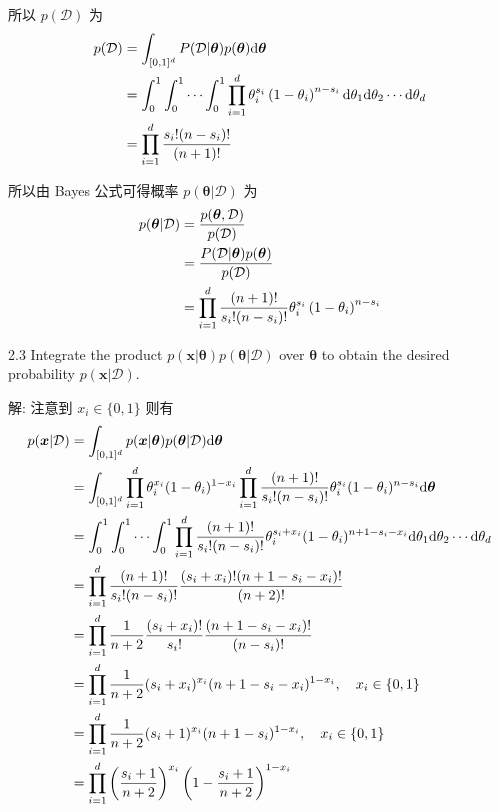 \documentclass{article}
\begin{document}
所以 $p(\mathcal{D})$ 为
\begin{equation}
  \begin{aligned}
    p(\mathcal{D})
    &=\int_{[0,1]^d} P(\mathcal{D}|\bm{\theta})p(\bm{\theta})\mathrm{d}\bm{\theta}\\
    &=\int_0^1\int_0^1\cdots\int_0^1 \prod_{i=1}^d\theta_{i}^{s_{i}}\left(1-\theta_{i}\right)^{n-s_{i}}\mathrm{d}\theta_1\mathrm{d}\theta_2\cdots\mathrm{d}\theta_d\\
    &=\prod_{i=1}^d\frac{s_i!(n-s_i)!}{(n+1)!}\\
  \end{aligned}
\end{equation}

所以由 Bayes 公式可得概率 $p(\bm{\theta}|\mathcal{D})$ 为
\begin{equation}
  \begin{aligned}
    p(\bm{\theta}|\mathcal{D})
    &=\frac{p(\bm{\theta},\mathcal{D})}{p(\mathcal{D})}\\
    &=\frac{P(\mathcal{D}|\bm{\theta})p(\bm{\theta})}{p(\mathcal{D})}\\
    &=\prod_{i=1}^d\frac{(n+1)!}{s_i!(n-s_i)!}\theta_{i}^{s_{i}}\left(1-\theta_{i}\right)^{n-s_{i}}\\
  \end{aligned}
\end{equation}

2.3 Integrate the product $p(\bm{x}|\bm{\theta}) p(\bm{\theta}|\mathcal{D})$ over $\bm{\theta}$ to obtain the desired probability $p(\bm{x}|\mathcal{D})$.

解: 注意到 $x_i\in\{0,1\}$ 则有
\begin{equation}
  \begin{aligned}
    p(\bm{x}|\mathcal{D})
    &=\int_{[0,1]^d} p(\bm{x}|\bm{\theta}) p(\bm{\theta}|\mathcal{D})\mathrm{d}\bm{\theta}\\
    &=\int_{[0,1]^d} \prod_{i=1}^{d} \theta_{i}^{x_{i}}(1-\theta_{i})^{1-x_{i}} \prod_{i=1}^d\frac{(n+1)!}{s_i!(n-s_i)!}\theta_{i}^{s_{i}}(1-\theta_{i})^{n-s_{i}}\mathrm{d}\bm{\theta}\\
    &=\int_0^1\int_0^1\cdots\int_0^1 \prod_{i=1}^{d}\frac{(n+1)!}{s_i!(n-s_i)!}\theta_{i}^{s_{i}+x_{i}}(1-\theta_{i})^{n+1-s_{i}-x_i}\mathrm{d}\theta_1\mathrm{d}\theta_2\cdots\mathrm{d}\theta_d\\
    &=\prod_{i=1}^{d}\frac{(n+1)!}{s_i!(n-s_i)!}\frac{(s_i+x_i)!(n+1-s_i-x_i)!}{(n+2)!}\\
    &=\prod_{i=1}^{d}\frac{1}{n+2}\frac{(s_i+x_i)!}{s_i!}\frac{(n+1-s_i-x_i)!}{(n-s_i)!}\\
    &=\prod_{i=1}^{d}\frac{1}{n+2}(s_i+x_i)^{x_i}(n+1-s_i-x_i)^{1-x_i},\quad x_i\in\{0,1\}\\
    &=\prod_{i=1}^{d}\frac{1}{n+2}(s_i+1)^{x_i}(n+1-s_i)^{1-x_i},\quad x_i\in\{0,1\}\\
    &=\prod_{i=1}^{d}\left(\frac{s_i+1}{n+2}\right)^{x_i}\left(1-\frac{s_i+1}{n+2}\right)^{1-x_i}\\
  \end{aligned}
\end{equation}
\end{document}
